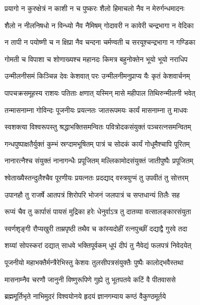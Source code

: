 \twolineshloka
{प्रयागो न कुरुक्षेत्रं न काशी न च पुष्करः}
{शैलो हिमाचलो नैव न मेरुर्गन्धमादनः}%

\twolineshloka
{शैलो न नीलनिषधो न विन्ध्यो नैव नैमिषम्}
{गोदावरी न कावेरी चन्द्रभागा न वेदिका}%

\twolineshloka
{न तापी न पयोष्णी च न क्षिप्रा नैव चन्दना}
{चर्मण्वती च सरयूश्चन्द्रभागा न गण्डिका}%

\twolineshloka
{गोमती च विपाशा च शोणाख्यश्च महानदः}
{किमत्र बहुनोक्तेन भूयो भूयो नराधिप}%

\twolineshloka
{उन्मीलनीसमं किञ्चिन्न देवः केशवात् परः}
{उन्मीलनीमनुप्राप्य यैः कृतं केशवार्चनम्}%

\twolineshloka
{पापचक्रसमूहस्य राशयः पतिताः क्षणात्}
{यस्मिन् मासे महीपाल तिथिरुन्मीलनी भवेत्}%

\twolineshloka
{तन्मासनाम्ना गोविन्दः पूजनीयः प्रयत्नतः}
{जातरूपमयः कार्यं मासनाम्ना तु माधवः}%

\twolineshloka
{स्वशक्त्या विश्वरूपस्तु श्रद्धाभक्तिसमन्वितः}
{पवित्रोदकसंयुक्तं पञ्चरत्नसमन्वितम्}%

\twolineshloka
{गन्धपुष्पाक्षतैर्युक्तं कुम्भं स्रग्दामभूषितम्}
{पात्रं च सोदकं कार्यं गोधूमैश्चापि पूरितम्}%

\twolineshloka
{नानारत्नैश्च संयुक्तं नानागन्धैः प्रपूजितम्}
{मल्लिकामोदसंयुक्तं जातीपुष्पैः प्रपूजितम्}%

\twolineshloka
{श्वेताख्यैस्तन्दुलैश्चैव पूरणीयः प्रयत्नतः}
{प्रदद्याद् वस्त्रयुग्मं तु उपवीतं तु सोत्तरम्}%

\twolineshloka
{उपानहौ तु राजर्षे आतपत्रं शिरोपरि}
{भोजनं जलपात्रं च सप्तधान्यं तिलैः सह}%

\twolineshloka
{रूप्यं चैव तु कार्पासं पायसं मुद्रिका हरेः}
{धेनुर्वाऽत्र तु दातव्या वत्सालङ्कारसंयुता}%

\twolineshloka
{स्वर्णशृङ्गी रौप्यखुरी ताम्रपृष्ठी तथैव च}
{कांस्यदोहीं रत्नपुच्छीं दद्याद्वै गुरवे तदा}%

\twolineshloka
{शय्यां सोपस्करां दद्यात् साधवे भक्तिपूर्वकम्}
{धूपं दीपं तु नैवेद्यं फलपत्रं निवेदयेत्}%

\twolineshloka
{पूजनीयो महाभक्तैर्मन्त्रैरेभिस्तु केशवः}
{तुलसीपत्रसंयुक्तैः पुष्पैः कालोद्भवैस्तथा}%

\twolineshloka
{मासनाम्नैव चरणौ जानुनी विष्णुरूपिणे}
{गुह्ये तु भूतपतये कटिं वै पीतवाससे}%

\twolineshloka
{ब्रह्ममूर्तिभृते नाभिमुदरं विश्वयोनये}
{हृदयं ज्ञानगम्याय कण्ठं वैकुण्ठमूर्तये}%


